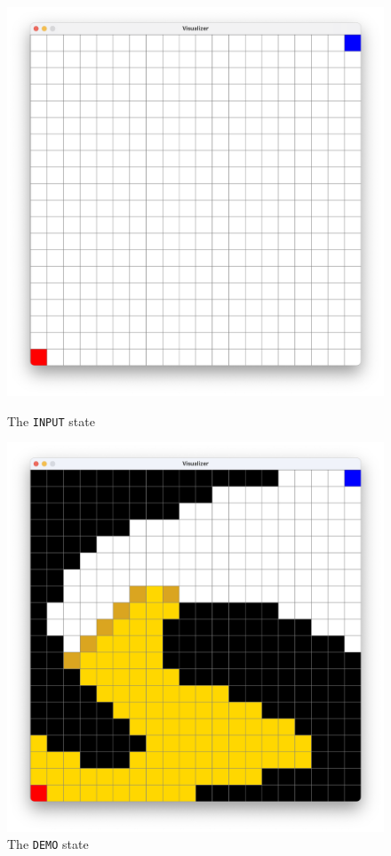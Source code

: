 \documentclass[pageno]{jpaper}
\begin{document}
\begin{figure}[hbt]
\begin{minipage}[b]{0.5\linewidth}
\centering
\includegraphics[width=.75\linewidth]{input_state.png}
\caption{The \texttt{INPUT} state}
\label{fig:side-a}
\end{minipage}
\hspace{0.5cm}
\begin{minipage}[b]{0.5\linewidth}
\centering
\includegraphics[width=.75\linewidth]{demo_state.png}
\caption{The \texttt{DEMO} state}
\label{fig:side-b}
\end{minipage}
\end{figure}
\end{document}
